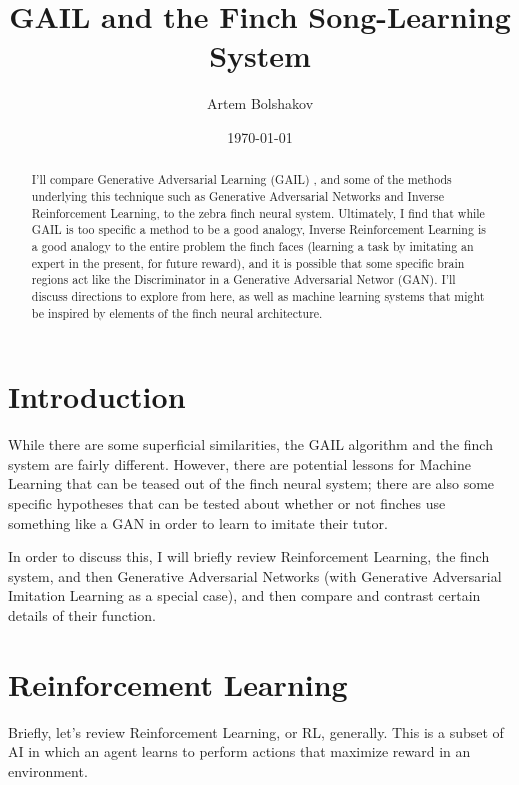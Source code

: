 \documentclass[aps,prl,preprint,groupedaddress]{revtex4-1}
\begin{document}
\title{GAIL and the Finch Song-Learning System}

\author{Artem Bolshakov}

\date{\today}

\begin{abstract}
I'll compare Generative Adversarial Learning (GAIL) \cite{gail}, and some of the methods underlying this technique 
such as Generative Adversarial Networks and Inverse Reinforcement Learning, to the zebra finch neural system. 
Ultimately, I find that while GAIL is too specific a method to be a good analogy, 
Inverse Reinforcement Learning is a good analogy to the entire problem the finch faces 
(learning a task by imitating an expert in the present, for future reward), 
and it is possible that some specific brain regions act like the Discriminator in a Generative Adversarial Networ (GAN). 
I'll discuss directions to explore from here, 
as well as machine learning systems that might be inspired by elements of the finch neural architecture.
\end{abstract}

\maketitle

\section{Introduction}

While there are some superficial similarities, the GAIL algorithm and the finch system are fairly different. 
However, there are potential lessons for Machine Learning that can be teased out of the finch neural system; 
there are also some specific hypotheses that can be tested about whether or not finches use something like a GAN
in order to learn to imitate their tutor.

In order to discuss this, I will briefly review Reinforcement Learning, the finch system, 
and then Generative Adversarial Networks (with Generative Adversarial Imitation Learning as a special case), 
and then compare and contrast certain details of their function.

\section{Reinforcement Learning}

Briefly, let's review Reinforcement Learning, or RL, generally. 
This is a subset of AI in which an agent learns to perform actions that maximize reward in an environment. 
\end{document}
